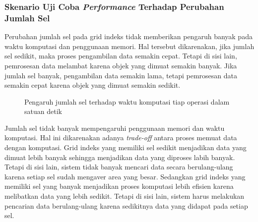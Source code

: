 \subsubsection{Skenario Uji Coba \textit{Performance} Terhadap Perubahan Jumlah Sel}

\tab Perubahan jumlah sel pada grid indeks tidak memberikan pengaruh banyak pada waktu komputasi dan penggunaan memori. Hal tersebut dikarenakan, jika jumlah sel sedikit, maka proses pengambilan data semakin cepat. Tetapi di sisi lain, pemrosesan data melambat karena objek yang dimuat semakin banyak. Jika jumlah sel banyak, pengambilan data semakin lama, tetapi pemrosesan data semakin cepat karena objek yang dimuat semakin sedikit.

\begin{figure}[H]
	\caption{Pengaruh jumlah sel terhadap waktu komputasi tiap operasi dalam satuan detik}\label{fig:uji-g}
\end{figure}

\tab Jumlah sel tidak banyak mempengaruhi penggunaan memori dan waktu komputasi. Hal ini dikarenakan adanya \textit{trade-off} antara proses memuat data dengan komputasi. Grid indeks yang memiliki sel sedikit menjadikan data yang dimuat lebih banyak sehingga menjadikan data yang diproses labih banyak. Tetapi di sisi lain, sistem tidak banyak mencari data secara berulang-ulang karena setiap sel sudah mengaver area yang besar. Sedangkan grid indeks yang memiliki sel yang banyak menjadikan proses komputasi lebih efisien karena melibatkan data yang lebih sedikit. Tetapi di sisi lain, sistem harus melakukan pencarian data berulang-ulang karena sedikitnya data yang didapat pada setiap sel.

